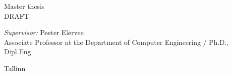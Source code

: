 \begin{titlepage}
	\vspace{2em}
	
	\begin{center}		
		\textsf{Master thesis}
		 \\\Huge{DRAFT}
	\end{center}
	
	\vspace{2cm}
	
	\begin{flushright}		
			
			\emph{Supervisor:} \quad Peeter Elervee \\
			\small{Associate Professor at the Department of Computer Engineering / Ph.D., Dipl.Eng.}		
	\end{flushright}
	
	\vspace{\fill}
	\begin{center} 
		Tallinn \the\year
	\end{center}	
\end{titlepage}
